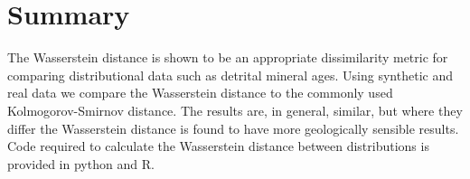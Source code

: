 \documentclass{article}
\begin{document}
\section*{Summary}

The Wasserstein distance is shown to be an appropriate dissimilarity metric for comparing distributional data such as detrital mineral ages. Using synthetic and real data we compare the Wasserstein distance to the commonly used Kolmogorov-Smirnov distance. The results are, in general, similar, but where they differ the Wasserstein distance is found to have more geologically sensible results. Code required to calculate the Wasserstein distance between distributions is provided in python and R.
\end{document}
